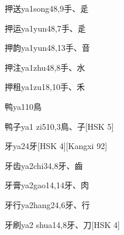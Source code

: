 \begin{entry}{押送}{ya1song4}{8,9}{⼿、⾡}
\end{entry}

\begin{entry}{押运}{ya1yun4}{8,7}{⼿、⾡}
\end{entry}

\begin{entry}{押韵}{ya1yun4}{8,13}{⼿、⾳}
\end{entry}

\begin{entry}{押注}{ya1zhu4}{8,8}{⼿、⽔}
\end{entry}

\begin{entry}{押租}{ya1zu1}{8,10}{⼿、⽲}
\end{entry}

\begin{entry}{鸭}{ya1}{10}{⿃}
\end{entry}

\begin{entry}{鸭子}{ya1 zi5}{10,3}{⿃、⼦}[HSK 5]
\end{entry}

\begin{entry}{牙}{ya2}{4}{⽛}[HSK 4][Kangxi 92]
\end{entry}

\begin{entry}{牙齿}{ya2chi3}{4,8}{⽛、⿒}
\end{entry}

\begin{entry}{牙膏}{ya2gao1}{4,14}{⽛、⾁}
\end{entry}

\begin{entry}{牙行}{ya2hang2}{4,6}{⽛、⾏}
\end{entry}

\begin{entry}{牙刷}{ya2 shua1}{4,8}{⽛、⼑}[HSK 4]
\end{entry}

